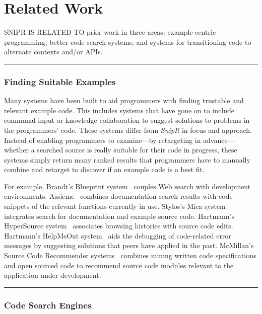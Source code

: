 \chapter{Related Work}{}
\label{sec:related}

\lettrine[lraise=0.1, nindent=0em, slope=-.5em]{S} {NIPR IS RELATED TO} prior work in three areas: example-centric programming; better code search systems; and systems for transitioning code to alternate contexts and/or APIs.

\fancybreak{\pfbreakdisplay}

\subsection{Finding Suitable Examples}
\label{sec:codesearch}

Many systems have been built to aid programmers with finding trustable and relevant example code. This includes systems that have gone on to include communal input or knowledge collaboration to suggest solutions to problems in the programmers' code. These systems differ from \emph{SnipR} in focus and approach. Instead of enabling programmers to examine---by retargeting in advance---whether a searched source is really suitable for their code in progress, these systems simply return many ranked results that programmers have to manually combine and retarget to discover if an example code is a best fit. 

For example, Brandt’s Blueprint system~\cite{Brandt:2010tp} couples Web search with development environments. Assieme~\cite{Hoffmann:2007wo} combines documentation search results with code snippets of the relevant functions currently in use. Stylos's Mica system~\cite{Stylos:2006gu} integrates search for documentation and example source code. Hartmann's HyperSource system~\cite{Hartmann:2011ii} associates browsing histories with source code edits. Hartmann's HelpMeOut system~\cite{Hartmann:2010hx} aids the debugging of code-related error messages by suggesting solutions that peers have applied in the past. McMillan's Source Code Recommender systems~\cite{McMillan:2012dj} combines mining written code specifications and open sourced code to recommend source code modules relevant to the application under development.

\fancybreak{\pfbreakdisplay}

\subsection{Code Search Engines}
\label{sec:searchengines}

